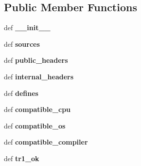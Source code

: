 \subsection*{Public Member Functions}
\begin{DoxyCompactItemize}
\item 
\hypertarget{classconfigure_1_1ModuleInfo_a3defe910f9a18a0ea4a069827d80cd7d}{def {\bfseries \-\_\-\-\_\-init\-\_\-\-\_\-}}\label{classconfigure_1_1ModuleInfo_a3defe910f9a18a0ea4a069827d80cd7d}

\item 
\hypertarget{classconfigure_1_1ModuleInfo_a698667c8758975f1095dc728dffed2b0}{def {\bfseries sources}}\label{classconfigure_1_1ModuleInfo_a698667c8758975f1095dc728dffed2b0}

\item 
\hypertarget{classconfigure_1_1ModuleInfo_ab4443cf96f47845a7b9d4b3fdc38c45a}{def {\bfseries public\-\_\-headers}}\label{classconfigure_1_1ModuleInfo_ab4443cf96f47845a7b9d4b3fdc38c45a}

\item 
\hypertarget{classconfigure_1_1ModuleInfo_afc3303fa8175304074fb676267535f32}{def {\bfseries internal\-\_\-headers}}\label{classconfigure_1_1ModuleInfo_afc3303fa8175304074fb676267535f32}

\item 
\hypertarget{classconfigure_1_1ModuleInfo_a3e54adca4f5a8117f04af44354e0d341}{def {\bfseries defines}}\label{classconfigure_1_1ModuleInfo_a3e54adca4f5a8117f04af44354e0d341}

\item 
\hypertarget{classconfigure_1_1ModuleInfo_adf565d4f2d981d934dade37fe7abc281}{def {\bfseries compatible\-\_\-cpu}}\label{classconfigure_1_1ModuleInfo_adf565d4f2d981d934dade37fe7abc281}

\item 
\hypertarget{classconfigure_1_1ModuleInfo_a8327dedabbe87e3984166f33998b5769}{def {\bfseries compatible\-\_\-os}}\label{classconfigure_1_1ModuleInfo_a8327dedabbe87e3984166f33998b5769}

\item 
\hypertarget{classconfigure_1_1ModuleInfo_a5ba12f33b7a92b1b43936122ec5d7a1a}{def {\bfseries compatible\-\_\-compiler}}\label{classconfigure_1_1ModuleInfo_a5ba12f33b7a92b1b43936122ec5d7a1a}

\item 
\hypertarget{classconfigure_1_1ModuleInfo_af972ec9025b70ac1395b223537316bb7}{def {\bfseries tr1\-\_\-ok}}\label{classconfigure_1_1ModuleInfo_af972ec9025b70ac1395b223537316bb7}


\end{DoxyCompactItemize}
